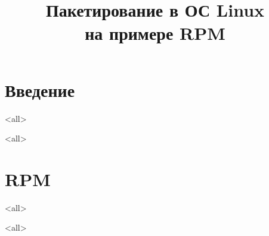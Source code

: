 

\title[RPM]{Пакетирование в ОС Linux\\на примере RPM}





\begin{frame}
	\frametitle{}
	\titlepage
	\vspace{-0.5cm}
	\begin{center}
	\end{center}
\end{frame}

\begin{frame}
	\tableofcontents
\end{frame}




\section{Введение}
\mode<all>{}

\mode<all>{}

\section{RPM}
\mode<all>{}

\mode<all>


